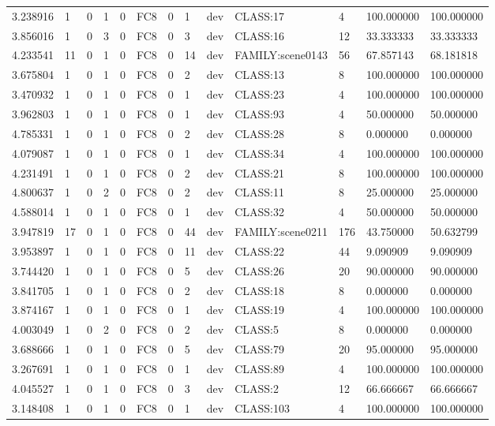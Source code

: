 \begin{tabular}{lllllllllllll}
3.238916 & 1 & 0 & 1 & 0 & FC8 & 0 & 1 & dev & CLASS:17 & 4 & 100.000000 & 100.000000 \\
3.856016 & 1 & 0 & 3 & 0 & FC8 & 0 & 3 & dev & CLASS:16 & 12 & 33.333333 & 33.333333 \\
4.233541 & 11 & 0 & 1 & 0 & FC8 & 0 & 14 & dev & FAMILY:scene0143 & 56 & 67.857143 & 68.181818 \\
3.675804 & 1 & 0 & 1 & 0 & FC8 & 0 & 2 & dev & CLASS:13 & 8 & 100.000000 & 100.000000 \\
3.470932 & 1 & 0 & 1 & 0 & FC8 & 0 & 1 & dev & CLASS:23 & 4 & 100.000000 & 100.000000 \\
3.962803 & 1 & 0 & 1 & 0 & FC8 & 0 & 1 & dev & CLASS:93 & 4 & 50.000000 & 50.000000 \\
4.785331 & 1 & 0 & 1 & 0 & FC8 & 0 & 2 & dev & CLASS:28 & 8 & 0.000000 & 0.000000 \\
4.079087 & 1 & 0 & 1 & 0 & FC8 & 0 & 1 & dev & CLASS:34 & 4 & 100.000000 & 100.000000 \\
4.231491 & 1 & 0 & 1 & 0 & FC8 & 0 & 2 & dev & CLASS:21 & 8 & 100.000000 & 100.000000 \\
4.800637 & 1 & 0 & 2 & 0 & FC8 & 0 & 2 & dev & CLASS:11 & 8 & 25.000000 & 25.000000 \\
4.588014 & 1 & 0 & 1 & 0 & FC8 & 0 & 1 & dev & CLASS:32 & 4 & 50.000000 & 50.000000 \\
3.947819 & 17 & 0 & 1 & 0 & FC8 & 0 & 44 & dev & FAMILY:scene0211 & 176 & 43.750000 & 50.632799 \\
3.953897 & 1 & 0 & 1 & 0 & FC8 & 0 & 11 & dev & CLASS:22 & 44 & 9.090909 & 9.090909 \\
3.744420 & 1 & 0 & 1 & 0 & FC8 & 0 & 5 & dev & CLASS:26 & 20 & 90.000000 & 90.000000 \\
3.841705 & 1 & 0 & 1 & 0 & FC8 & 0 & 2 & dev & CLASS:18 & 8 & 0.000000 & 0.000000 \\
3.874167 & 1 & 0 & 1 & 0 & FC8 & 0 & 1 & dev & CLASS:19 & 4 & 100.000000 & 100.000000 \\
4.003049 & 1 & 0 & 2 & 0 & FC8 & 0 & 2 & dev & CLASS:5 & 8 & 0.000000 & 0.000000 \\
3.688666 & 1 & 0 & 1 & 0 & FC8 & 0 & 5 & dev & CLASS:79 & 20 & 95.000000 & 95.000000 \\
3.267691 & 1 & 0 & 1 & 0 & FC8 & 0 & 1 & dev & CLASS:89 & 4 & 100.000000 & 100.000000 \\
4.045527 & 1 & 0 & 1 & 0 & FC8 & 0 & 3 & dev & CLASS:2 & 12 & 66.666667 & 66.666667 \\
3.148408 & 1 & 0 & 1 & 0 & FC8 & 0 & 1 & dev & CLASS:103 & 4 & 100.000000 & 100.000000 \\

\end{tabular}
